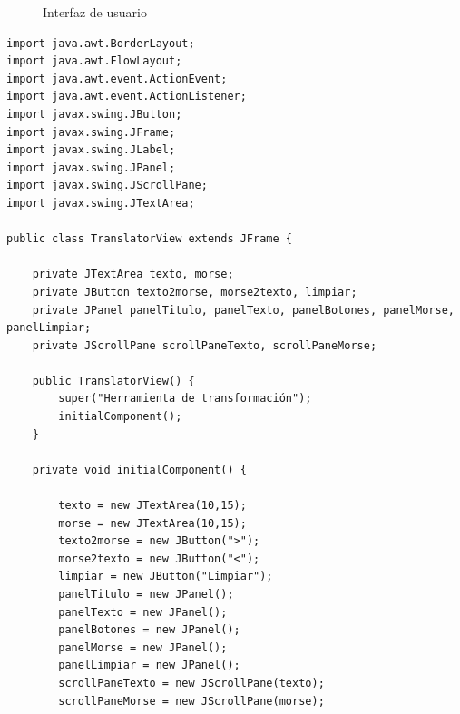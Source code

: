 \documentclass[10pt]{article}
\begin{document}
{\begin{enumerate}
    \begin{figure}[h]
        \begin{center}
            \caption{Interfaz de usuario}\label{fig:graf-user-mt}
        \end{center}
    \end{figure}

\begin{verbatim}
import java.awt.BorderLayout;
import java.awt.FlowLayout;
import java.awt.event.ActionEvent;
import java.awt.event.ActionListener;
import javax.swing.JButton;
import javax.swing.JFrame;
import javax.swing.JLabel;
import javax.swing.JPanel;
import javax.swing.JScrollPane;
import javax.swing.JTextArea;

public class TranslatorView extends JFrame {

    private JTextArea texto, morse;
    private JButton texto2morse, morse2texto, limpiar;
    private JPanel panelTitulo, panelTexto, panelBotones, panelMorse, panelLimpiar;
    private JScrollPane scrollPaneTexto, scrollPaneMorse;
    
    public TranslatorView() {
        super("Herramienta de transformación");
        initialComponent();
    }

    private void initialComponent() {
        
        texto = new JTextArea(10,15);
        morse = new JTextArea(10,15);
        texto2morse = new JButton(">");
        morse2texto = new JButton("<");
        limpiar = new JButton("Limpiar");
        panelTitulo = new JPanel();
        panelTexto = new JPanel();
        panelBotones = new JPanel();
        panelMorse = new JPanel();
        panelLimpiar = new JPanel();
        scrollPaneTexto = new JScrollPane(texto);
        scrollPaneMorse = new JScrollPane(morse);
        

\end{verbatim}
\end{enumerate}}
\end{document}
